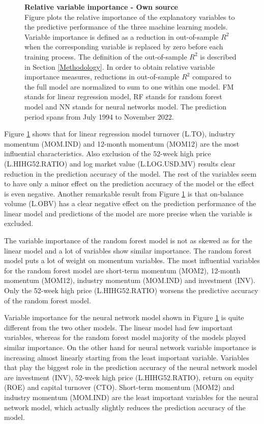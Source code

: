 \documentclass[12pt]{article}
\begin{document}
\begin{figure}[p]
\centering
\caption[Relative variable importance]{\textbf{Relative variable importance \textnormal{- Own source}}\\ Figure plots the relative importance of the explanatory variables to the predictive performance of the three machine learning models. Variable importance is defined as a reduction in out-of-sample $R^2$ when the corresponding variable is replaced by zero before each training process. The definition of the out-of-sample $R^2$ is described in Section \ref{Methodology}. In order to obtain relative variable importance measures, reductions in out-of-sample $R^2$ compared to the full model are normalized to sum to one within one model. FM stands for linear regression model, RF stands for random forest model and NN stands for neural networks model. The prediction period spans from July 1994 to November 2022.}

\label{plot:relative_VI}
\end{figure}

Figure \ref{plot:relative_VI} shows that for linear regression model turnover (L.TO), industry momentum (MOM.IND) and 12-month momentum (MOM12) are the most influential characteristics. Also exclusion of the 52-week high price (L.HIHG52.RATIO) and log market value (L.LOG.USD.MV) results clear reduction in the prediction accuracy of the model. The rest of the variables seem to have only a minor effect on the prediction accuracy of the model or the effect is even negative. Another remarkable result from Figure \ref{plot:relative_VI} is that on-balance volume (L.OBV) has a clear negative effect on the prediction performance of the linear model and predictions of the model are more precise when the variable is excluded. \par

The variable importance of the random forest model is not as skewed as for the linear model and a lot of variables show similar importance. The random forest model puts a lot of weight on momentum variables. The most influential variables for the random forest model are short-term momentum (MOM2), 12-month momentum (MOM12), industry momentum (MOM.IND) and investment (INV). Only the 52-week high price (L.HIHG52.RATIO) worsens the predictive accuracy of the random forest model. \par

Variable importance for the neural network model shown in Figure \ref{plot:relative_VI} is quite different from the two other models. The linear model had few important variables, whereas for the random forest model majority of the models played similar importance. On the other hand for neural network variable importance is increasing almost linearly starting from the least important variable. Variables that play the biggest role in the prediction accuracy of the neural network model are investment (INV), 52-week high price (L.HIHG52.RATIO), return on equity (ROE) and capital turnover (CTO). Short-term momentum (MOM2) and industry momentum (MOM.IND) are the least important variables for the neural network model, which actually slightly reduces the prediction accuracy of the model. \par 
\end{document}
